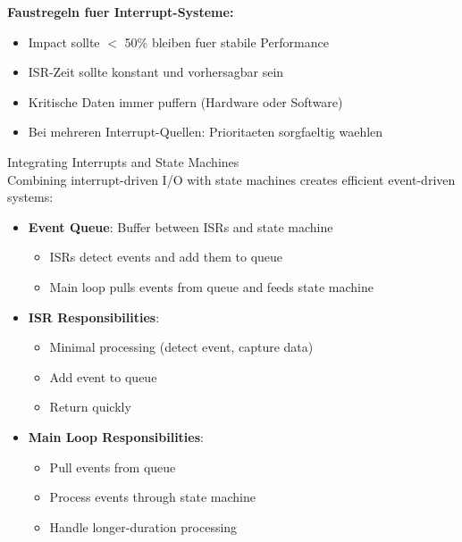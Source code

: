 \begin{remark}
    \textbf{Faustregeln fuer Interrupt-Systeme:}
    \begin{itemize}
        \item Impact sollte $<$ 50\% bleiben fuer stabile Performance
        \item ISR-Zeit sollte konstant und vorhersagbar sein
        \item Kritische Daten immer puffern (Hardware oder Software)
        \item Bei mehreren Interrupt-Quellen: Prioritaeten sorgfaeltig waehlen
    \end{itemize}
\end{remark}

\begin{concept}{Integrating Interrupts and State Machines}\\
Combining interrupt-driven I/O with state machines creates efficient event-driven systems:
\begin{itemize}
    \item \textbf{Event Queue}: Buffer between ISRs and state machine
    \begin{itemize}
        \item ISRs detect events and add them to queue
        \item Main loop pulls events from queue and feeds state machine
    \end{itemize}
    \item \textbf{ISR Responsibilities}:
    \begin{itemize}
        \item Minimal processing (detect event, capture data)
        \item Add event to queue
        \item Return quickly
    \end{itemize}
    \item \textbf{Main Loop Responsibilities}:
    \begin{itemize}
        \item Pull events from queue
        \item Process events through state machine
        \item Handle longer-duration processing
    \end{itemize}
\end{itemize}
\end{concept}

